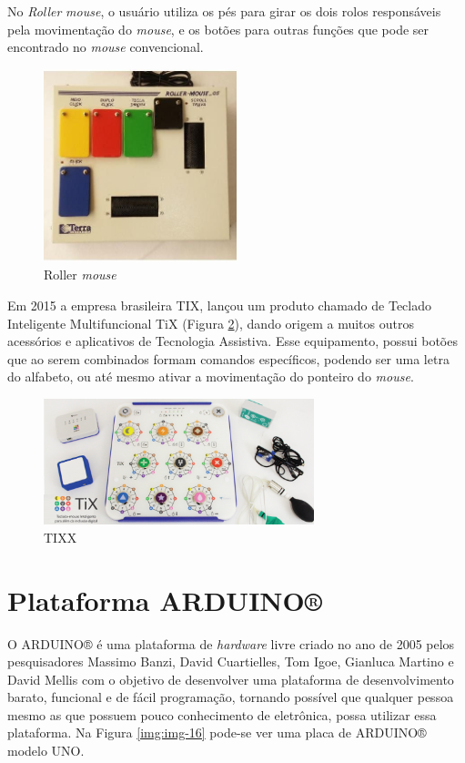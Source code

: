 \documentclass[
	12pt,			%
	openright,		%
	oneside,			%
	a4paper,			%
	chapter=TITLE,		%
	english,			%
	brazil,			%
	]{abntex2}
\begin{document}
No \emph{Roller} \emph{mouse}, o usuário utiliza os pés para girar os dois rolos responsáveis pela movimentação do \emph{mouse}, e os botões para outras funções que pode ser encontrado no \emph{mouse} convencional.

\begin{figure}[H]
	\centering
		\includegraphics[width=0.5\textwidth]{./img/img-9.jpg}
		\caption{Roller \emph{mouse}}
		\label{img:img-9}
\end{figure}

Em 2015 a empresa brasileira TIX, lançou um produto chamado de Teclado Inteligente Multifuncional TiX (Figura \ref{img:img-14}), dando origem a muitos outros acessórios e aplicativos de Tecnologia Assistiva. Esse equipamento, possui botões que ao serem combinados formam comandos específicos, podendo ser uma letra do alfabeto, ou até mesmo ativar a movimentação do ponteiro do \emph{mouse}.

\begin{figure}[H]
	\centering
		\includegraphics[width=0.7\textwidth]{./img/img-14.png}
		\caption{TIXX}
		\label{img:img-14}
\end{figure}

\section{Plataforma ARDUINO®}

O ARDUINO® é uma plataforma de \emph{hardware} livre criado no ano de 2005 pelos pesquisadores Massimo Banzi, David Cuartielles, Tom Igoe, Gianluca Martino e David Mellis com o objetivo de desenvolver uma plataforma de desenvolvimento barato, funcional e de fácil programação, tornando possível que qualquer pessoa mesmo as que possuem pouco conhecimento de eletrônica, possa utilizar essa plataforma. Na Figura \ref{img:img-16} pode-se ver uma placa de ARDUINO® modelo UNO.
\end{document}
